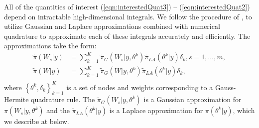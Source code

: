\documentclass[ba]{imsart}
\begin{document}
All of the quantities of interest (\ref{eqn:interestedQuat3}) -- (\ref{eqn:interestedQuat2}) depend on intractable high-dimensional integrals. We follow the procedure of \cite{casecross}, to utilize Gaussian and Laplace approximations combined with numerical quadrature to approximate each of these integrals accurately and efficiently. The approximations take the form:
\begin{equation}\begin{aligned}\label{eqn:integration}
\tilde{\pi}(W_{s}|y) &= \sum_{k=1}^{K}
\tilde{\pi}_{G}(W_{s}|y,\theta^{k})
\tilde{\pi}_{LA}(\theta^{k}|y)\delta_{k}, s = 1,\ldots,m , \\
\tilde{\pi}(W|y) &= \sum_{k=1}^{K}
\tilde{\pi}_{G}(W|y,\theta^{k})
\tilde{\pi}_{LA}(\theta^{k}|y)\delta_{k} , \\
\end{aligned}\end{equation}
where $\left\{\theta^{k},\delta_{k}\right\}_{k=1}^{K}$ is a set of nodes and weights corresponding to a Gauss-Hermite quadrature rule. The $\tilde{\pi}_{G}(W_{s}|y,\theta^{k})$ is a Gaussian approximation for $\pi(W_{s}|y,\theta^{k})$ and the $\tilde{\pi}_{LA}(\theta^{k}|y)$ is a Laplace approximation for $\pi(\theta^{k}|y)$, which we describe at below.
\end{document}
